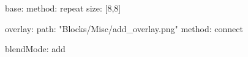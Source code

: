 base:
  method: repeat
  size: [8,8]

overlay:
  path: "Blocks/Misc/add_overlay.png"
  method: connect

blendMode: add